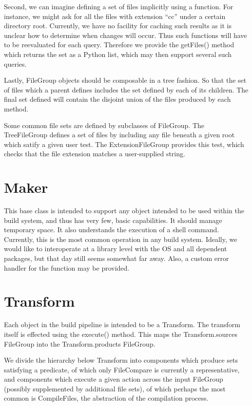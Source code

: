 Second, we can imagine defining a set of files implicitly using a function. For instance, we might ask for all the files
with extension ``cc'' under a certain directory root. Currently, we have no facility for caching such results as it is
unclear how to determine when changes will occur. Thus such functions will have to be reevaluated for each
query. Therefore we provide the getFiles() method which returns the set as a Python list, which may then support several
such queries.

Lastly, FileGroup objects should be composable in a tree fashion. So that the set of files which a parent defines
includes the set defined by each of its children. The final set defined will contain the disjoint union of the files
produced by each method.

Some common file sets are defined by subclasses of FileGroup. The TreeFileGroup defines a set of files by including any
file beneath a given root which satify a given user test. The ExtensionFileGroup provides this test, which checks that
the file extension matches a user-supplied string.

\section{Maker}

This base class is intended to support any object intended to be used within the build system, and thus has very few,
basic capabilities. It should manage temporary space. It also understands the execution of a shell command. Currently,
this is the most common operation in any build system. Ideally, we would like to interoperate at a library level with
the OS and all dependent packages, but that day still seems somewhat far away. Also, a custom error handler for the
function may be provided.

\section{Transform}

Each object in the build pipeline is intended to be a Transform. The transform itself is effected using the execute()
method. This maps the Transform.sources FileGroup into the Transform.products FileGroup.

We divide the hierarchy below Transform into components which produce sets satisfying a predicate, of which only
FileCompare is currently a representative, and components which execute a given action across the input FileGroup
(possibly supplemented by additional file sets), of which perhaps the most common is CompileFiles, the abstraction of
the compilation process.

